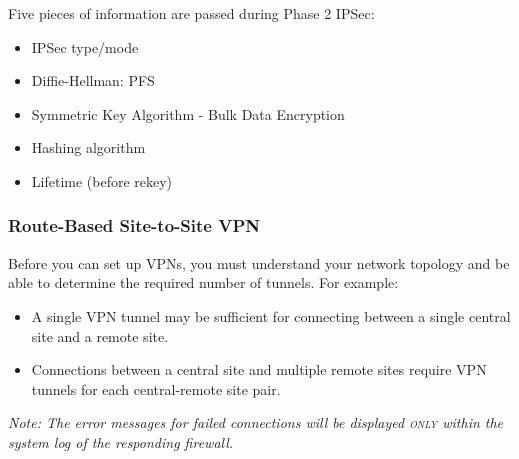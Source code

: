 Five pieces of information are passed during Phase 2 IPSec:
\begin{itemize}
    \item IPSec type/mode
    \item Diffie-Hellman: PFS
    \item Symmetric Key Algorithm - Bulk Data Encryption
    \item Hashing algorithm
    \item Lifetime (before rekey)
\end{itemize}

\subsubsection{Route-Based Site-to-Site VPN}
Before you can set up VPNs, you must understand your network topology and be able to determine the required number of tunnels. For example:
\begin{itemize}
    \item A single VPN tunnel may be sufficient for connecting between a single central site and a remote site.
    \item Connections between a central site and multiple remote sites require VPN tunnels for each central-remote site pair.
\end{itemize}

\textit{Note: The error messages for failed connections will be displayed \textsc{only} within the system log of the responding firewall.}

